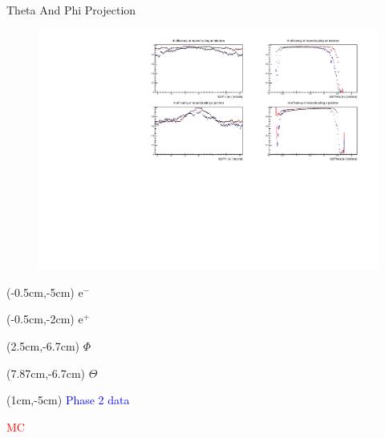 \documentclass[8pt]{beamer}
\begin{document}
\begin{frame}{Theta And Phi Projection}
	\begin{figure}
		\centering
		\includegraphics[width=\textwidth]{Plots/Eff/MCDataEff}
	\end{figure}

	\begin{textblock*}{0.3\textwidth}(-0.5cm,-5cm)
		$\textrm{e}^-$
	\end{textblock*}
	\begin{textblock*}{0.3\textwidth}(-0.5cm,-2cm)
		$\textrm{e}^+$
	\end{textblock*}


	\begin{textblock*}{0.3\textwidth}(2.5cm,-6.7cm)
		$\Phi$
	\end{textblock*}


	\begin{textblock*}{0.3\textwidth}(7.87cm,-6.7cm)
	$\Theta$
\end{textblock*}


\begin{textblock*}{0.5\textwidth}(1cm,-5cm)
	\textcolor{blue}{Phase 2 data}
	
	\textcolor{red}{MC}
	
	
\end{textblock*}
	
\end{frame}
\end{document}
